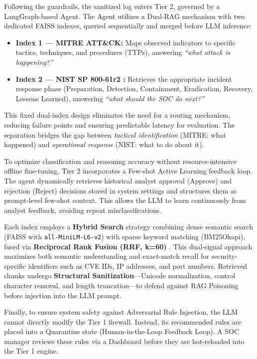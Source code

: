 \documentclass[12pt,a4paper]{article}
\begin{document}
Following the guardrails, the sanitized log enters Tier 2, governed by a LangGraph-based Agent. The Agent utilizes a Dual-RAG mechanism with two dedicated FAISS indexes, queried sequentially and merged before LLM inference:
\begin{itemize}
    \item \textbf{Index 1 — MITRE ATT\&CK:} Maps observed indicators to specific tactics, techniques, and procedures (TTPs), answering \textit{``what attack is happening?''}
    \item \textbf{Index 2 — NIST SP 800-61r2 \cite{nist80061}:} Retrieves the appropriate incident response phase (Preparation, Detection, Containment, Eradication, Recovery, Lessons Learned), answering \textit{``what should the SOC do next?''}
\end{itemize}
This fixed dual-index design eliminates the need for a routing mechanism, reducing failure points and ensuring predictable latency for evaluation. The separation bridges the gap between \textit{tactical identification} (MITRE: what happened) and \textit{operational response} (NIST: what to do about it).

To optimize classification and reasoning accuracy without resource-intensive offline fine-tuning, Tier 2 incorporates a Few-shot Active Learning feedback loop. The agent dynamically retrieves historical analyst approval (Approve) and rejection (Reject) decisions stored in system settings and structures them as prompt-level few-shot context. This allows the LLM to learn continuously from analyst feedback, avoiding repeat misclassifications.

Each index employs a \textbf{Hybrid Search} strategy combining dense semantic search (FAISS with \verb|all-MiniLM-L6-v2|) with sparse keyword matching (BM25Okapi), fused via \textbf{Reciprocal Rank Fusion (RRF, k=60)} \cite{rrf2009}. This dual-signal approach maximizes both semantic understanding and exact-match recall for security-specific identifiers such as CVE IDs, IP addresses, and port numbers. Retrieved chunks undergo \textbf{Structural Sanitization}---Unicode normalization, control character removal, and length truncation---to defend against RAG Poisoning before injection into the LLM prompt.

Finally, to ensure system safety against Adversarial Rule Injection, the LLM cannot directly modify the Tier 1 firewall. Instead, its recommended rules are placed into a Quarantine state (Human-in-the-Loop Feedback Loop). A SOC manager reviews these rules via a Dashboard before they are hot-reloaded into the Tier 1 engine.
\end{document}
